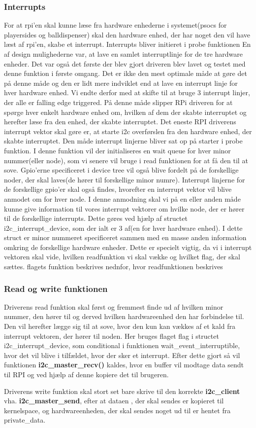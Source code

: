 \documentclass[Softwaredesign/Softwaredesign_main.tex]{subfiles}
\begin{document}
\subsubsection{Interrupts}
For at rpi'en skal kunne læse fra hardware enhederne i systemet(psocs for playersides og balldispenser) skal den hardware enhed, der har noget den vil have læst af rpi'en, skabe et interrupt. Interrupts bliver initieret i probe funktionen 
 En af design mulighederne var, at lave en samlet interruptlinje for de tre hardware enheder. Det var også det første der blev gjort driveren blev lavet og testet med denne funktion i første omgang. Det er ikke den mest optimale måde at gøre det på denne måde og den er lidt mere indviklet end at lave en interrupt linje for hver hardware enhed. Vi endte derfor med at skifte til at bruge 3 interrupt linjer, der alle er falling edge triggered. På denne måde slipper RPi driveren for at spørge hver enkelt hardware enhed om, hvilken af dem der skabte interruptet og herefter læse fra den enhed, der skabte interruptet. Det eneste RPI driverens interrupt vektor skal gøre er, at starte i2c overførslen fra den hardware enhed, der skabte interruptet. Den måde interrupt linjerne bliver sat op på starter i probe funktion. I denne funktion vil der initialiseres en wait queue for hver minor nummer(eller node), som vi senere vil bruge i  read funktionen for at få den til at sove. Gpio'erne specificeret i device tree vil også blive fordelt på de forskellige noder, der skal laves(de hører til forskellige minor numre). Interrupt linjerne for de forskellige gpio'er skal også findes, hvorefter en interrupt vektor vil blive anmodet om for hver node. I denne anmodning skal vi på en eller anden måde kunne give information til vores interrupt vektorer om hvilke node, der er hører til de forskellige interrupts. Dette gøres ved hjælp af structet i2c\_interrupt\_device, som der ialt er 3 af(en for hver hardware enhed). I dette struct er minor nummeret specificeret sammen med en masse anden information omkring de forskellige hardware enheder. Dette er specielt vigtig, da vi i interrupt vektoren skal vide, hvilken readfunktion vi skal vække og hvilket flag, der skal sættes. flagets funktion beskrives nednfor, hvor readfunktionen beskrives
 \subsubsection{Read og write funktionen}
 Driverens read funktion skal først og fremmest finde ud af hvilken minor nummer, den hører til og derved hvilken hardwareenhed den har forbindelse til. Den vil herefter lægge sig til at sove, hvor den kun kan vækkes af et kald fra interrupt vektoren, der hører til noden. Her bruges flaget flag i structet i2c\_interrupt\_device, som conditional i funktionen wait\_event\_interruptible, hvor det vil blive i tilfældet, hvor der sker et interrupt. Efter dette gjort så vil funktionen \textbf{i2c\_master\_recv()} kaldes, hvor en buffer vil modtage data sendt til RPI og ved hjælp af denne kopiere det til brugeren.
 
 Driverens write funktion skal stort set bare skrive til den korrekte \textbf{i2c\_client} vha. \textbf{i2c\_master\_send}, efter at dataen , der skal sendes er kopieret til kernelspace, og hardwareenheden, der skal sendes noget ud til er hentet fra private\_data.
\end{document}
